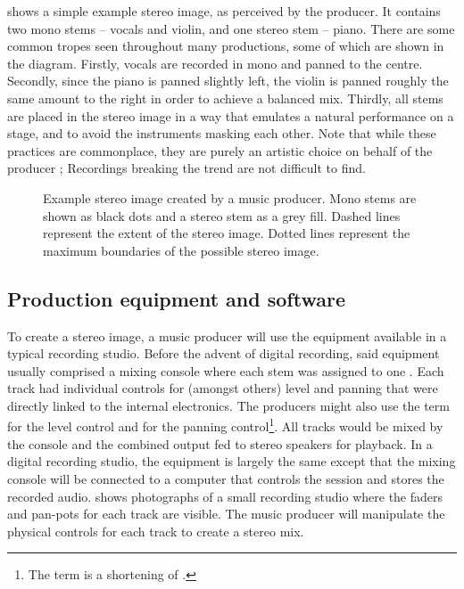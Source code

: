  shows a simple example stereo image, as perceived by the producer. It contains two mono stems -- vocals and violin, and one stereo stem -- piano. There are some common tropes seen throughout many productions, some of which are shown in the diagram. Firstly, vocals are recorded in mono and panned to the centre. Secondly, since the piano is panned slightly left, the violin is panned roughly the same amount to the right in order to achieve a balanced mix. Thirdly, all stems are placed in the stereo image in a way that emulates a natural performance on a stage, and to avoid the instruments masking each other. Note that while these practices are commonplace, they are purely an artistic choice on behalf of the producer \cite{owsinskiMixingEngineersHandbook2006}; Recordings breaking the trend are not difficult to find.


\begin{figure}[htb]
    \centering
    
    \caption{Example stereo image created by a music producer. Mono stems are shown as black dots and a stereo stem as a grey fill. Dashed lines represent the extent of the stereo image. Dotted lines represent the maximum boundaries of the possible stereo image.}
    \label{fig:stereo_image}
\end{figure}

\subsection{Production equipment and software}

To create a stereo image, a music producer will use the equipment available in a typical recording studio. Before the advent of digital recording, said equipment usually comprised a mixing console where each stem was assigned to one . Each track had individual controls for (amongst others) level and panning that were directly linked to the internal electronics. The producers might also use the term  for the level control and  for the panning control\footnote{The term  is a shortening of .}. All tracks would be mixed by the console and the combined output fed to stereo speakers for playback. In a digital recording studio, the equipment is largely the same except that the mixing console will be connected to a computer that controls the session and stores the recorded audio.  shows photographs of a small recording studio where the faders and pan-pots for each track are visible. The music producer will manipulate the physical controls for each track to create a stereo mix.

